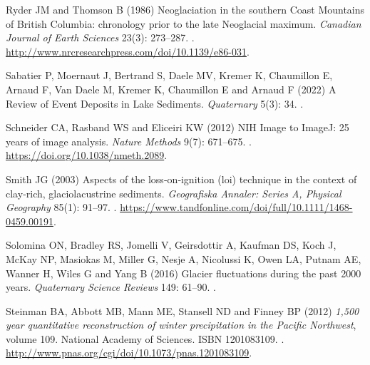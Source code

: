 \documentclass[Royal,times,doublespace,sageh]{sagej}
\begin{document}
\begin{thebibliography}{68}
{
Ryder JM and Thomson B (1986) {Neoglaciation in the southern Coast Mountains of
  British Columbia: chronology prior to the late Neoglacial maximum}.
\newblock \emph{Canadian Journal of Earth Sciences} 23(3): 273--287.
\newblock {}.
\newblock \urlprefix\url{http://www.nrcresearchpress.com/doi/10.1139/e86-031}.

Sabatier P, Moernaut J, Bertrand S, Daele MV, Kremer K, Chaumillon E, Arnaud F,
  {Van Daele} M, Kremer K, Chaumillon E and Arnaud F (2022) {A Review of Event
  Deposits in Lake Sediments}.
\newblock \emph{Quaternary} 5(3): 34.
\newblock {}.

Schneider CA, Rasband WS and Eliceiri KW (2012) {NIH Image to ImageJ: 25 years
  of image analysis}.
\newblock \emph{Nature Methods} 9(7): 671--675.
\newblock {}.
\newblock \urlprefix\url{https://doi.org/10.1038/nmeth.2089}.

Smith JG (2003) {Aspects of the loss‐on‐ignition (loi) technique in the
  context of clay‐rich, glaciolacustrine sediments}.
\newblock \emph{Geografiska Annaler: Series A, Physical Geography} 85(1):
  91--97.
\newblock {}.
\newblock
  \urlprefix\url{https://www.tandfonline.com/doi/full/10.1111/1468-0459.00191}.

Solomina ON, Bradley RS, Jomelli V, Geirsdottir A, Kaufman DS, Koch J, McKay
  NP, Masiokas M, Miller G, Nesje A, Nicolussi K, Owen LA, Putnam AE, Wanner H,
  Wiles G and Yang B (2016) {Glacier fluctuations during the past 2000 years}.
\newblock \emph{Quaternary Science Reviews} 149: 61--90.
\newblock {}.

Steinman BA, Abbott MB, Mann ME, Stansell ND and Finney BP (2012) \emph{{1,500
  year quantitative reconstruction of winter precipitation in the Pacific
  Northwest}}, volume 109.
\newblock National Academy of Sciences.
\newblock ISBN 1201083109.
\newblock {}.
\newblock \urlprefix\url{http://www.pnas.org/cgi/doi/10.1073/pnas.1201083109}.

}
\end{thebibliography}
\end{document}

